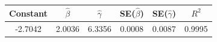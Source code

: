 \begin{tabular}{cccccc}
\toprule
Constant & $\hat{\beta}$ & $\hat{\gamma}$ & SE($\hat{\beta}$) & SE($\hat{\gamma}$) & $R^2$ \\
\midrule
-2.7042 & 2.0036 & 6.3356 & 0.0008 & 0.0087 & 0.9995 \\
\bottomrule
\end{tabular}